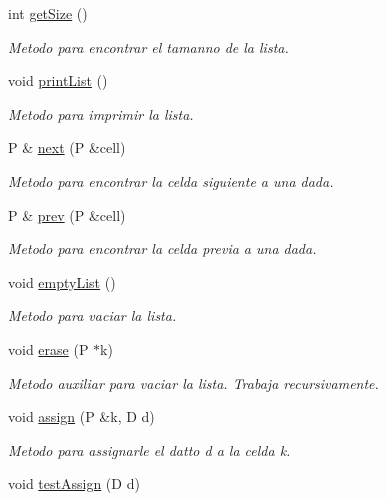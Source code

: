 \begin{DoxyCompactItemize}
int \hyperlink{classListWithPointer_ac70c49b5703887fd867e90cdac3c706f}{get\+Size} ()
\begin{DoxyCompactList}\small\item\em Metodo para encontrar el tamanno de la lista. \end{DoxyCompactList}\item 
void \hyperlink{classListWithPointer_a7079b5f1dbddb87a7e33ffc71ebb7b92}{print\+List} ()
\begin{DoxyCompactList}\small\item\em Metodo para imprimir la lista. \end{DoxyCompactList}\item 
P \& \hyperlink{classListWithPointer_a3aec82866e03a1f37175c4b0976eeb47}{next} (P \&cell)
\begin{DoxyCompactList}\small\item\em Metodo para encontrar la celda siguiente a una dada. \end{DoxyCompactList}\item 
P \& \hyperlink{classListWithPointer_a89f1ef1d78fe7f78290eaab585a14cca}{prev} (P \&cell)
\begin{DoxyCompactList}\small\item\em Metodo para encontrar la celda previa a una dada. \end{DoxyCompactList}\item 
void \hyperlink{classListWithPointer_aec4f5374971962c79d397bbcd0080199}{empty\+List} ()
\begin{DoxyCompactList}\small\item\em Metodo para vaciar la lista. \end{DoxyCompactList}\item 
void \hyperlink{classListWithPointer_a0727a8a01df92681f13a74acd8dc2247}{erase} (P $\ast$k)
\begin{DoxyCompactList}\small\item\em Metodo auxiliar para vaciar la lista. Trabaja recursivamente. \end{DoxyCompactList}\item 
void \hyperlink{classListWithPointer_a5703464a7cd48d871e3bb04562a3d351}{assign} (P \&k, D d)
\begin{DoxyCompactList}\small\item\em Metodo para assignarle el datto d a la celda k. \end{DoxyCompactList}\item 
void \hyperlink{classListWithPointer_a2c37ce3c8ddaec5dba538b9357a13bba}{test\+Assign} (D d)

\end{DoxyCompactItemize}
